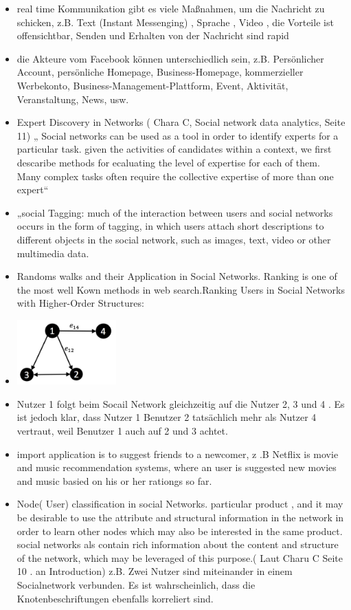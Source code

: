 \begin{itemize}
\item real time Kommunikation gibt es viele Maßnahmen, um die Nachricht zu schicken, z.B. Text (Instant Messenging) , Sprache , Video , die Vorteile ist offensichtbar,  Senden und Erhalten von der Nachricht sind rapid
\item die Akteure vom Facebook können unterschiedlich sein, z.B. Persönlicher Account, persönliche Homepage, Business-Homepage, kommerzieller Werbekonto, Business-Management-Plattform, Event, Aktivität, Veranstaltung, News, usw.
\item Expert Discovery in Networks ( Chara C, Social network data analytics, Seite 11) „ Social networks can be used as a tool in order to identify experts for a particular task. given the activities of candidates within a context, we first descaribe methods for ecaluating the level of expertise for each of them. Many complex tasks often require the collective expertise of more than one expert“
\item „social Tagging:  much of the interaction between users and social networks occurs in the form of tagging, in which users attach short descriptions to different objects in the social network, such as images, text, video or other multimedia data.
\item Randoms walks and their Application in Social Networks. Ranking is one of the most well Kown methods in web search.Ranking Users in Social Networks with Higher-Order Structures:
\item \includegraphics[width=0.3\textwidth]{bilder/social-network-users.png}
\item Nutzer 1 folgt beim Socail Network  gleichzeitig auf die Nutzer 2, 3 und 4 . Es ist jedoch klar, dass Nutzer 1 Benutzer 2 tatsächlich mehr  als Nutzer 4 vertraut, weil Benutzer 1 auch auf 2 und 3 achtet.
\item import application is to suggest  friends to a newcomer, z .B Netflix   is movie and music recommendation systems, where an user is suggested new movies and music basied on his or her rationgs so far.
\item Node( User) classification in social Networks. particular product , and it may be desirable to use the attribute and structural information in the network in order to learn other nodes which may also be interested in the same product. social networks als contain rich information about the content and structure of the network, which may be leveraged of this purpose.( Laut Charu C Seite 10 . an Introduction) z.B.  Zwei Nutzer sind miteinander in einem Socialnetwork verbunden. Es ist wahrscheinlich, dass die Knotenbeschriftungen ebenfalls korreliert sind.

\end{itemize}
